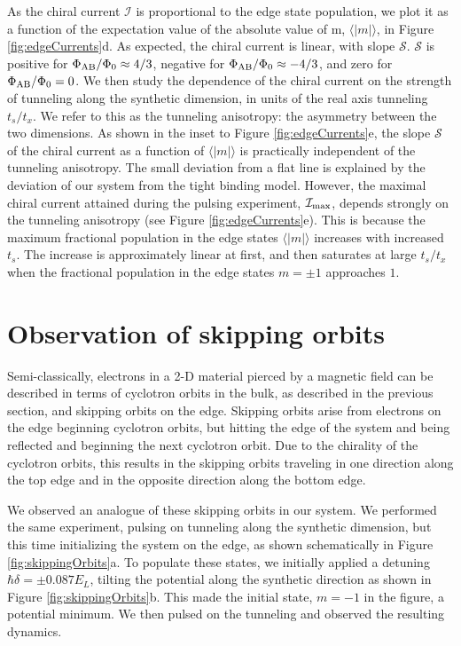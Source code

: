 As the chiral current $\mathcal{I}$ is proportional to the edge state population, we plot it as a function of the expectation value of the absolute value of m, $\langle|m|\rangle$, in Figure \ref{fig:edgeCurrents}d. As expected, the chiral current is linear, with slope $\mathcal{S}$. $\mathcal{S}$ is positive for $\Phi_{\rm AB}/\Phi_0\approx4/3$, negative for $\Phi_{\rm AB}/\Phi_0\approx-4/3$, and zero for $\Phi_{\rm AB}/\Phi_0=0$. We then study the dependence of the chiral current on the strength of tunneling along the synthetic dimension, in units of the real axis tunneling $t_s/t_x$. We refer to this as the tunneling anisotropy: the asymmetry between the two dimensions. As shown in the inset to Figure \ref{fig:edgeCurrents}e, the slope $\mathcal{S}$ of the chiral current as a function of $\langle|m|\rangle$ is practically independent of the tunneling anisotropy. The small deviation from a flat line is explained by the deviation of our system from the tight binding model. However, the maximal chiral current attained during the pulsing experiment, $\mathcal{I}_{\rm max}$, depends strongly on the tunneling anisotropy (see Figure \ref{fig:edgeCurrents}e). This is because the maximum fractional population in the edge states $\langle|m|\rangle$ increases with increased $t_s$. The increase is approximately linear at first, and then saturates at large $t_s/t_x$ when the fractional population in the edge states $m=\pm1$ approaches $1$.


\section{Observation of skipping orbits}

Semi-classically, electrons in a 2-D material pierced by a magnetic field can be described in terms of cyclotron orbits in the bulk, as described in the previous section, and skipping orbits on the edge. Skipping orbits arise from electrons on the edge beginning cyclotron orbits, but hitting the edge of the system and being reflected and beginning the next cyclotron orbit. Due to the chirality of the cyclotron orbits, this results in the skipping orbits traveling in one direction along the top edge and in the opposite direction along the bottom edge.   

We observed an analogue of these skipping orbits in our system. We performed the same experiment, pulsing on tunneling along the synthetic dimension, but this time initializing the system on the edge, as shown schematically in Figure \ref{fig:skippingOrbits}a. To populate these states, we initially applied a detuning $\hbar\delta=\pm0.087 E_L$, tilting the potential along the synthetic direction as shown in Figure \ref{fig:skippingOrbits}b. This made the initial state, $m=-1$ in the figure, a potential minimum. We then pulsed on the tunneling and observed the resulting dynamics. 

